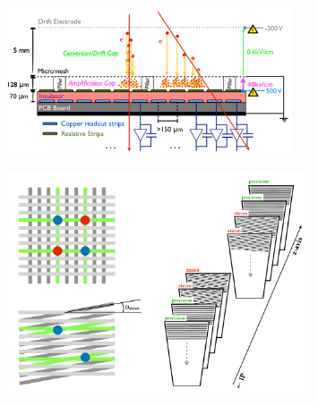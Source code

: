 \begin{figure}[!htb]
    \begin{center}
        \includegraphics[width=0.75\textwidth]{figures/nsw/nsw_mm_principle}
        \caption{
        }
        \label{fig:nsw_mm_principle}
    \end{center}
\end{figure}

\begin{figure}[!htb]
    \begin{center}
        \includegraphics[width=0.8\textwidth]{figures/nsw/mm_stereo_cartoonPDF}
        \caption{
        }
        \label{fig:mm_stereo}
    \end{center}
\end{figure}

